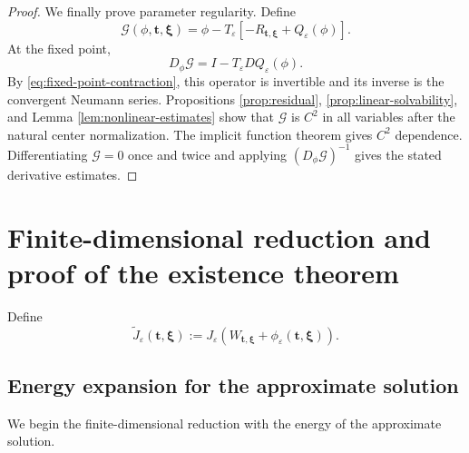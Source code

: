 \documentclass[11pt]{article}
\numberwithin{equation}{section}
\begin{document}
\begin{proof}
We finally prove parameter regularity. Define
\[
\mathscr G(\phi,\boldsymbol t,\boldsymbol\xi)
=\phi-T_\varepsilon[-R_{\boldsymbol t,\boldsymbol\xi}
+Q_\varepsilon(\phi)].
\]
At the fixed point,
\begin{equation*}
D_\phi\mathscr G
=I-T_\varepsilon DQ_\varepsilon(\phi).
\end{equation*}
By \eqref{eq:fixed-point-contraction}, this operator is invertible and
its inverse is the convergent Neumann series. Propositions
\ref{prop:residual}, \ref{prop:linear-solvability}, and Lemma
\ref{lem:nonlinear-estimates} show that $\mathscr G$ is $C^2$ in all
variables after the natural center normalization. The implicit
function theorem gives $C^2$ dependence. Differentiating
$\mathscr G=0$ once and twice and applying
$(D_\phi\mathscr G)^{-1}$ gives the stated derivative estimates.
\end{proof}

\section{Finite-dimensional reduction and proof of the existence theorem}

Define
\begin{equation}\label{eq:reduced-energy}
\widetilde J_\varepsilon(\boldsymbol t,\boldsymbol\xi)
:=J_\varepsilon(W_{\boldsymbol t,\boldsymbol\xi}
+\phi_\varepsilon(\boldsymbol t,\boldsymbol\xi)).
\end{equation}

\subsection{Energy expansion for the approximate solution}

We begin the finite-dimensional reduction with the energy of the approximate solution.
\end{document}
